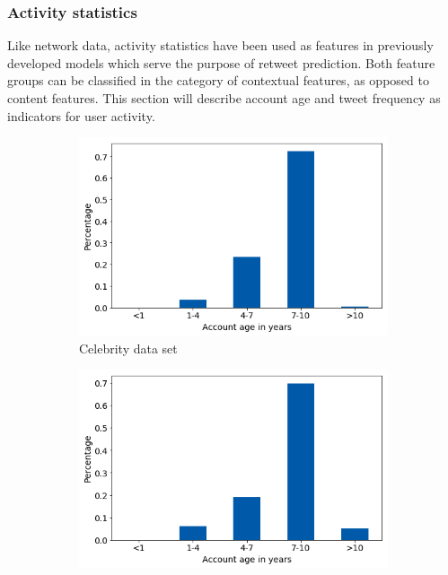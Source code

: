 \subsubsection{Activity statistics}
\label{sec:activity_stats}

Like network data, activity statistics have been used as features in previously
developed models which serve the purpose of retweet prediction.
Both feature groups can be classified in the category of contextual features,
as opposed to content features.
This section will describe account age and tweet frequency as indicators
for user activity.

\begin{figure}[h]
\centering
\begin{subfigure}{.33\textwidth}
  \centering
  \includegraphics[width=.95\linewidth]{img/celeb_age_distr}
  \caption{Celebrity data set}
  \label{fig:age_distr_sub1}
\end{subfigure}%
\begin{subfigure}{.33\textwidth}
  \centering
  \includegraphics[width=.95\linewidth]{img/polit_age_distr}

\end{subfigure}
\end{figure}
